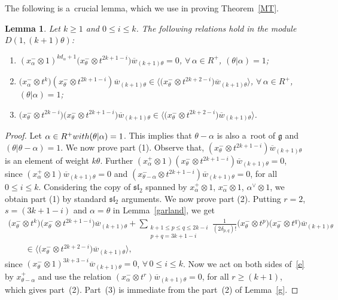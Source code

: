 \documentclass[11pt]{article}
\newtheorem{lemma}{Lemma}
\numberwithin{equation}{section}
\begin{document}
The following is a~crucial lemma, which we use in proving Theorem~\ref{MT}.
\begin{lemma}
\label{crucial}
Let $k\geq 1$ and $0\leq i \leq k$. The following relations hold in the module $D(1,(k+1)\theta)$:
\begin{enumerate}\itemsep=0pt
\item[$1)$] $(x^{-}_{\alpha} \otimes 1)^{kd_{\alpha}+1}\big(x^{-}_{\theta} \otimes t^{2k+1-i}\big) \overline{w}_{(k+1)\theta}=0$,
$\forall\, \alpha \in R^{+}$, $(\theta|\alpha)=1$;
\item[$2)$] $\big(x^{-}_{\alpha} \otimes t^{k}\big) (x^{-}_{\theta} \otimes t^{2k+1-i}) \overline{w}_{(k+1)\theta} \in
\big\langle \big(x^{-}_{\theta} \otimes t^{2k+2-i}\big) \overline{w}_{(k+1)\theta} \big\rangle$,
$\forall\, \alpha \in R^{+}$, $(\theta|\alpha)=1$;
\item[$3)$] $\big(x^{-}_{\theta} \otimes t^{2k-i}\big) \big(x^{-}_{\theta} \otimes t^{2k+1-i}\big) \overline{w}_{(k+1)\theta}
\in
\big\langle \big(x^{-}_{\theta} \otimes t^{2k+2-i}\big) \overline{w}_{(k+1)\theta} \big\rangle$.
\end{enumerate}
\end{lemma}
\begin{proof}
Let $ \alpha \in R^{+} \textup{with} (\theta|\alpha)=1$. This implies that $\theta-\alpha$ is also a~root of
$\mathfrak{g}$ and $(\theta|\theta-\alpha)=1$. We now prove part (1).
Observe that, $(x^{-}_{\theta} \otimes t^{2k+1-i}) \overline{w}_{(k+1)\theta}$ is an element of weight $k\theta$.
Further $(x^{+}_{\alpha} \otimes 1) (x^{-}_{\theta} \otimes t^{2k+1-i}) \overline{w}_{(k+1)\theta}=0$, since
$(x^{+}_{\alpha} \otimes 1)\overline{w}_{(k+1)\theta}=0$ and $(x^{-}_{\theta-\alpha} \otimes t^{2k+1-i}) \overline{w}_{(k+1)\theta}=0$,
for all $0\leq i \leq k$.
Considering the copy of $\mathfrak{sl}_2$ spanned by $x^{+}_{\alpha} \otimes 1$, $x^{-}_{\alpha} \otimes 1$,
$\alpha^{\vee}\otimes 1$, we obtain part (1) by standard $\mathfrak{sl}_2$ arguments.
We now prove part (2).
Putting $r=2$, $s=(3k+1-i)$ and $\alpha=\theta$ in Lemma~\ref{garland}, we get
\begin{gather}
\big(x^{-}_{\theta} \otimes t^{k}\big) \big(x^{-}_{\theta} \otimes t^{2k+1-i}\big) \overline{w}_{(k+1)\theta} +
\sum\limits_{\substack{k+1\leq p\leq q \leq 2k-i\\p+q= 3k+1-i}}
\frac{1}{(2\delta_{p, q})!} \big(x^{-}_{\theta} \otimes t^{p}\big) \big(x^{-}_{\theta} \otimes t^{q}\big)
\overline{w}_{(k+1)\theta}
\nonumber\\
\qquad{}
\in
\big\langle\big(x^{-}_{\theta}\otimes t^{2k+2-i}\big) \overline{w}_{(k+1)\theta} \big\rangle, \label{e}
\end{gather}
since $(x^{-}_{\theta}\otimes 1)^{3k+3-i}\overline{w}_{(k+1)\theta}=0$, $\forall\, 0\leq i \leq k$.
Now we act on both sides of~\eqref{e} by $x^{+}_{\theta-\alpha}$ and use the relation $(x^{-}_{\alpha} \otimes t^r) \overline{w}_{(k+1)\theta}=0$,
for all $r\geq(k+1)$, which gives part~(2).
Part~(3) is immediate from the part~(2) of Lemma~\ref{g}.
\end{proof}
\end{document}
